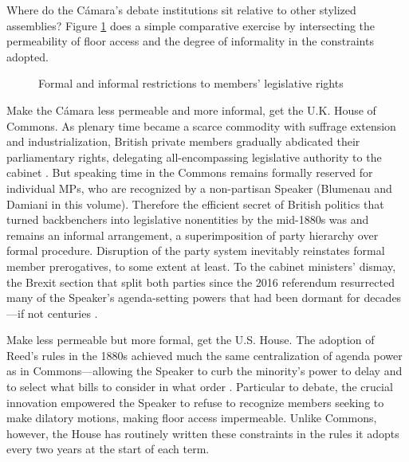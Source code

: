 \documentclass[letter,12pt]{article}
\begin{document}
Where do the Cámara's debate institutions sit relative to other stylized assemblies? Figure \ref{F:comparison} does a simple comparative exercise by intersecting the permeability of floor access and the degree of informality in the constraints adopted.

\begin{figure}
  \centering
\caption{Formal and informal restrictions to members' legislative rights}\label{F:comparison}
\end{figure}

Make the Cámara less permeable and more informal, get the U.K. House of Commons. As plenary time became a scarce commodity with suffrage extension and industrialization, British private members gradually abdicated their parliamentary rights, delegating all-encompassing legislative authority to the cabinet \citep{cox.1987}. But speaking time in the Commons remains formally reserved for individual MPs, who are recognized by a non-partisan Speaker (Blumenau and Damiani in this volume). Therefore the efficient secret of British politics that turned backbenchers into legislative nonentities by the mid-1880s was and remains an informal arrangement, a superimposition of party hierarchy over formal procedure. Disruption of the party system inevitably reinstates formal member prerogatives, to some extent at least. To the cabinet ministers' dismay, the Brexit section that split both parties since the 2016 referendum resurrected many of the Speaker's agenda-setting powers that had been dormant for decades---if not centuries \citep{economist-bercow.2019}.

Make less permeable but more formal, get the U.S. House. The adoption of Reed's rules in the 1880s achieved much the same centralization of agenda power as in Commons---allowing the Speaker to curb the minority's power to delay and to select what bills to consider in what order \citep{denhartog.2004phd,cox.mccubbins.2005}. Particular to debate, the crucial innovation empowered the Speaker to refuse to recognize members seeking to make dilatory motions, making floor access impermeable. Unlike Commons, however, the House has routinely written these constraints in the rules it adopts every two years at the start of each term.  
\end{document}
